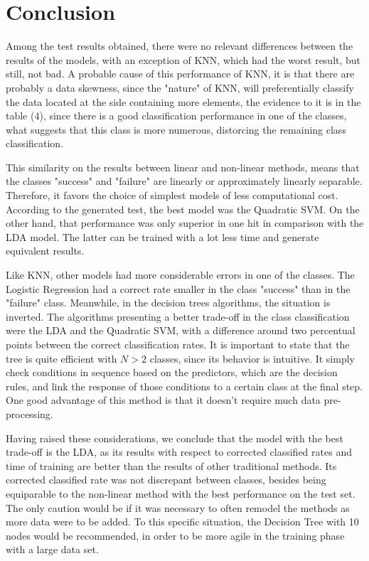 \section{Conclusion}

Among the test results obtained, there were no relevant differences between the results 
of the models, with an exception of KNN, which had the worst result, but still, not bad. 
A probable cause of this performance of KNN, it is that there are probably a data skewness, 
since the "nature" of KNN, will preferentially classify the data located at the side 
containing more elements, the evidence to it is in the table (4), since there is a 
good classification performance in one of the classes, what suggests that this class 
is more numerous, distorcing the remaining class classification.

This similarity on the results between linear and non-linear methods, means that 
the classes "success" and "failure" are linearly or approximately linearly separable. 
Therefore, it favors the choice of simplest models of less computational cost. 
According to the generated test, the best model was the Quadratic SVM. On the other hand,
that performance was only superior in one hit in comparison with the LDA model. The latter
can be trained with a lot less time and generate equivalent results. 

Like KNN, other models had more considerable errors in one of the classes. The Logistic
Regression had a correct rate smaller in the class "success" than in the "failure" class.
Meanwhile, in the decision trees algorithms, the situation is inverted. The algorithms 
presenting a better trade-off in the class classification were the LDA and the 
Quadratic SVM, with a difference around two percentual points between the correct 
classification rates. It is important to state that the tree is quite efficient with $N>2$ 
classes, since its behavior is intuitive. It simply check conditions in sequence
based on the predictors, which are the decision rules, and link the response of those 
conditions to a certain class at the final step. One good advantage of this method is that it 
doesn't require much data pre-processing.

Having raised these considerations, we conclude that the model with the best
trade-off is the LDA, as its results with respect to corrected classified rates and 
time of training are better than the results of other traditional methods. Its 
corrected classified rate was not discrepant between classes, besides being equiparable 
to the non-linear method with the best performance on the test set. The only caution would 
be if it was necessary to often remodel the methods as more data were to be added.
To this specific situation, the Decision Tree with 10 nodes would be recommended, in order to be 
more agile in the training phase with a large data set.

